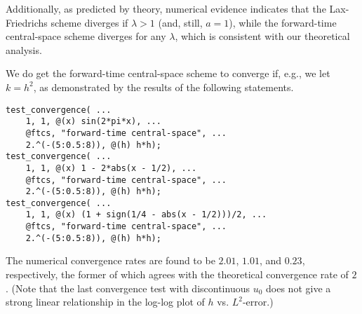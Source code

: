 \documentclass{article}
\begin{document}
\begin{itemize}
Additionally, as predicted by theory, numerical evidence indicates that the Lax-Friedrichs scheme diverges if $\lambda > 1$ (and, still, $a = 1$), while the forward-time central-space scheme diverges for any $\lambda$, which is consistent with our theoretical analysis.

We do get the forward-time central-space scheme to converge if, e.g., we let $k = h^2$, as demonstrated by the results of the following statements.
\begin{verbatim}
test_convergence( ...
    1, 1, @(x) sin(2*pi*x), ...
    @ftcs, "forward-time central-space", ...
    2.^(-(5:0.5:8)), @(h) h*h);
test_convergence( ...
    1, 1, @(x) 1 - 2*abs(x - 1/2), ...
    @ftcs, "forward-time central-space", ...
    2.^(-(5:0.5:8)), @(h) h*h);
test_convergence( ...
    1, 1, @(x) (1 + sign(1/4 - abs(x - 1/2)))/2, ...
    @ftcs, "forward-time central-space", ...
    2.^(-(5:0.5:8)), @(h) h*h);
\end{verbatim}
The numerical convergence rates are found to be $2.01$, $1.01$, and $0.23$, respectively, the former of which agrees with the theoretical convergence rate of $2$. (Note that the last convergence test with discontinuous $u_0$ does not give a strong linear relationship in the log-log plot of $h$ vs. $L^2$-error.)

\end{itemize}
\end{document}
